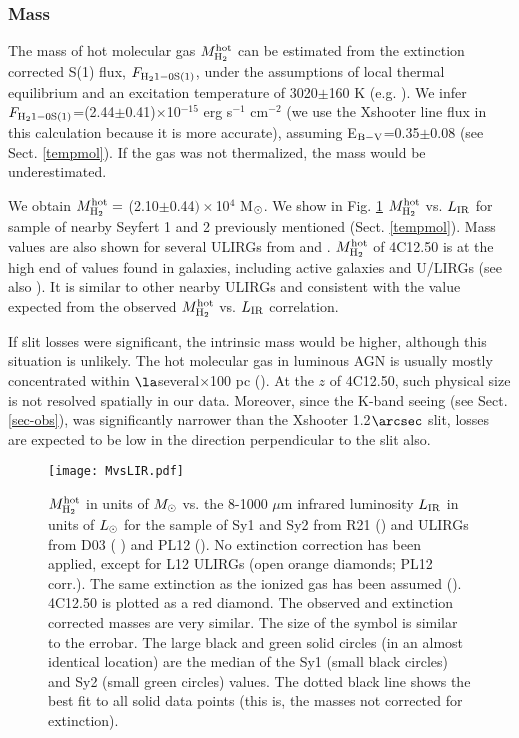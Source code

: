 \documentclass{aa}
\begin{document}
\subsubsection{Mass}
\label{massmol}

The mass of hot molecular gas $M_{\rm H_2}^{\rm hot}$ can be estimated from the extinction corrected S(1) flux, $F_{\rm H_2 1-0 S(1)}$,   under the assumptions of local thermal equilibrium and an excitation temperature of 3020$\pm$160 K  (e.g. \citealt{Scoville1982,Riffel2014}). We infer $F_{\rm H_2 1-0 S(1)}$=(2.44$\pm$0.41)$\times$10$^{-15}$  erg s$^{-1}$ cm$^{-2}$   (we use the Xshooter line flux in this calculation because it is more accurate), assuming E$_{\rm B-V}$=0.35$\pm$0.08 (see Sect. \ref{tempmol}).  If the gas was not thermalized, the mass would be underestimated. 

We obtain  $M_{\rm H_2}^{\rm hot}=$  (2.10$\pm$0.44$)\times$10$^{4}$ M$_{\rm \odot}$. 
 We show in Fig. \ref{mvslir} $M_{\rm H_2}^{\rm hot}$  vs. $L_{\rm IR}$ for  \citealt{Riffel2021} sample of nearby Seyfert 1 and 2 previously mentioned (Sect. \ref{tempmol}). Mass values are also shown for several  ULIRGs from \cite{Davies2003} and \cite{Piqueras2012}.    $M_{\rm H_2}^{\rm hot}$ of 4C12.50  is at the high end of values  found in  galaxies, including active galaxies and U/LIRGs (see also \citealt{Ardila2005,Piqueras2012,Mazzalay2013,Mezcua2015,Riffel2021}). It is similar to other nearby ULIRGs and 
consistent with the value expected from  the observed $M_{\rm H_2}^{\rm hot}$ vs. $L_{\rm IR}$ correlation.  

If  slit losses were  significant, the intrinsic  mass would be  higher, although this situation is unlikely.
 The hot molecular gas in luminous AGN is usually mostly concentrated within   $\la$several$\times$100 pc (\citealt{Mezcua2015,Riffel2021}). At the $z$ of 4C12.50, such physical size is not resolved spatially in our data.    Moreover, since the  K-band seeing (see Sect. \ref{sec-obs}),  was significantly narrower than the Xshooter 1.2$\arcsec$ slit,  losses are expected to be low in the direction perpendicular to the slit also.   


\begin{figure}
\centering
\texttt{[image: MvsLIR.pdf]}
\caption{$M_{\rm H_2}^{\rm hot}$ in units of $M_{\rm \odot}$ vs.  the 8-1000 $\mu$m infrared luminosity $L_{\rm IR}$  in units of $L_{\rm \odot}$ for  the sample of Sy1 and Sy2 from R21 (\citealt{Riffel2021}) and ULIRGs from D03 ( \citealt{Davies2003}) and PL12 (\citealt{Piqueras2012}). No extinction correction has been applied, except for L12 ULIRGs (open orange diamonds; PL12 corr.).  The same extinction as the ionized gas has been assumed (\citealt{Piqueras2013}). 4C12.50 is plotted as a red diamond. The observed and extinction corrected masses are very similar. The size of the symbol is similar to the errobar. The large black and green solid circles (in an almost identical location) are the median  of the Sy1 (small black circles) and Sy2 (small green circles) values. The dotted black line shows the best fit to all  solid data points (this is, the masses not corrected for extinction).}
\label{mvslir}
\end{figure}
\end{document}
